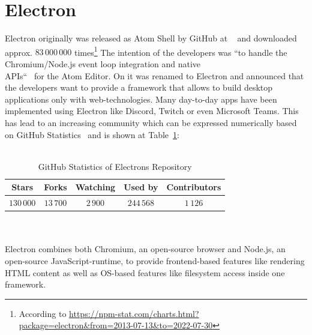\section{Electron}
\label{sec:electron}
Electron originally was released as Atom Shell by GitHub at ~\cite{githubReleaseV010} and downloaded approx. $83\,000\,000$ times\footnote{According to \url{https://npm-stat.com/charts.html?package=electron&from=2013-07-13&to=2022-07-30}}
The intention of the developers was ``to handle the Chromium/Node.js event loop integration and native\\APIs``~\cite{sawicki_2015} for the Atom Editor.
On  it was renamed to Electron and announced that the developers want to provide a framework that allows to build desktop applications only with web-technologies.
Many day-to-day apps have been implemented using Electron like Discord, Twitch or even Microsoft Teams.
This has lead to an increasing community which can be expressed numerically based on GitHub Statistics~\cite{GithubElectron} and is shown at Table~\ref{tab:electron:statistics}: \\ \\
\begin{table}[h]
    \begin{tabular} {| c | c | c | c | c |}
        Stars      & Forks     & Watching & Used by    & Contributors \\ \hline
        $130\,000$ & $13\,700$ & $2\,900$ & $244\,568$ & $1\,126$
    \end{tabular}
    \caption{\label{tab:electron:statistics}GitHub Statistics of Electrons Repository}
\end{table}\\ \\
Electron combines both Chromium, an open-source browser and Node.js, an open-source JavaScript-runtime, to provide frontend-based features like rendering \ac{HTML} content as well as \ac{OS}-based features like filesystem access inside one framework.
